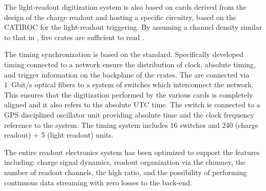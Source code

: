 The light-readout digitization system is also based on   cards derived from the design of the charge readout and hosting a specific circuitry, based on the CATIROC  for the light-readout triggering. By assuming a  channel density similar to that in , five  crates are sufficient to read \dpnumpmtch {}.

The timing synchronization is based on the  standard. Specifically developed timing  connected to a  network ensure the distribution of clock, absolute timing, and trigger information on the backplane of the  crates. The  are connected via \SI{1}{Gbit/s} optical fibers to a system of  switches which interconnect the  network. This ensures that the digitization performed by the various  cards is completely aligned and it also refers to the absolute UTC time. 
The  switch is connected to a GPS disciplined oscillator unit providing absolute time and the clock frequency reference to the system. The timing system includes \num{16}  switches and \num{240} (charge readout) + \num{5} (light readout)  units.    


The entire readout electronics system has been optimized to support the \dual features including: charge signal dynamics, readout organization via the chimney, the number of readout channels, the high  ratio, and the possibility of performing continuous data streaming with zero losses to the  back-end. 


